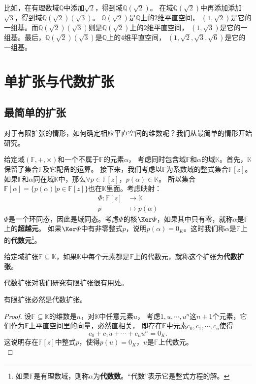 \documentclass[12pt,UTF8,fontset=none]{ctexbook}
\begin{document}
\begin{appendix}
比如，在有理数域$\mathbb{Q}$中添加$\sqrt{2}$，得到域$\mathbb{Q}(\sqrt{2})$。
在域$\mathbb{Q}(\sqrt{2})$中再添加添加$\sqrt{3}$，得到域$\mathbb{Q}(\sqrt{2})(\sqrt{3})$。
$\mathbb{Q}(\sqrt{2})$是$\mathbb{Q}$上的$2$维平直空间，
$(1, \sqrt{2})$是它的一组基。而$\mathbb{Q}(\sqrt{2})(\sqrt{3})$则是$\mathbb{Q}(\sqrt{2})$上的$2$维平直空间，
$(1, \sqrt{3})$是它的一组基。最后，$\mathbb{Q}(\sqrt{2})(\sqrt{3})$是$\mathbb{Q}$上的$4$维平直空间，
$(1, \sqrt{2}, \sqrt{3},\sqrt{6})$是它的一组基。   

\section{单扩张与代数扩张}
\subsection{最简单的扩张}
对于有限扩张的情形，如何确定相应平直空间的维数呢？我们从最简单的情形开始研究。

给定域$(\mathbb{F}, +, \times)$和一个不属于$\mathbb{F}$的元素$\alpha$，
考虑同时包含域$\mathbb{F}$和$\alpha$的域$\mathbb{K}$。首先，$\mathbb{K}$保留了集合$\mathbb{F}$及它配备的运算。
接下来，我们考虑以$\mathbb{F}$为系数域的整式集合$\mathbb{F}[z]$。
如果$\mathbb{F}$和$\alpha$同在域$\mathbb{K}$中，那么$\forall p \in \mathbb{F}[z]$，$p(\alpha) \in \mathbb{K}$。
所以集合$\mathbb{F}[\alpha] = \{p(\alpha) | p \in \mathbb{F}[z]\}$也在$\mathbb{K}$里面。考虑映射：
\begin{align*}
    \varPhi : \mathbb{F}[z] &\rightarrow \mathbb{K}  \\
    p &\mapsto p(\alpha)  
\end{align*}
$\varPhi$是一个环同态，因此是域同态。考虑$\varPhi$的核$\Ker\varPhi$，如果其中只有零，就称$\alpha$是$\mathbb{F}$上的\textbf{超越元}。
如果$\Ker\varPhi$中有非零整式$p$，说明$p(\alpha) = 0_K$。这时我们称$\alpha$是$\mathbb{F}$上的\textbf{代数元}\footnote{如果$\mathbb{F}$是有理数域，则称$\alpha$为\textbf{代数数}。“代数”表示它是整式方程的解。}。
\begin{df}\label{df:9_0}
    给定域扩张$\mathbb{F} \subseteq \mathbb{K}$，如果$\mathbb{K}$中每个元素都是$\mathbb{F}$上的代数元，就称这个扩张为\textbf{代数扩张}。
\end{df}
代数扩张对我们研究有限扩张很有用处。
\begin{pp}\label{pp:9_0_1}
    有限扩张必然是代数扩张。
\end{pp}
\begin{proof} %
    设$\mathbb{F} \subseteq \mathbb{K}$的维数是$n$，对$\mathbb{K}$中任意元素$u$，
    考虑$1, u, \cdots, u^n$这$n+1$个元素，它们作为$\mathbb{F}$上平直空间里的向量，必然直相关，
    即存在$\mathbb{F}$中元素$c_0, c_1, \cdots , c_n$使得
    $$ c_0 + c_1 u + \cdots + c_n u^n = 0_K.$$
    这说明存在$\mathbb{F}[z]$中整式$p$，使得$p(u) = 0_K$，$u$是$\mathbb{F}$上代数元。\\
\end{proof}



\end{appendix}
\end{document}

